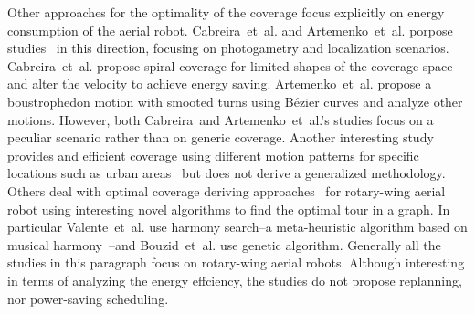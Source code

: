 Other approaches for the optimality of the coverage focus explicitly on energy consumption of the aerial robot. Cabreira~et~al. and Artemenko~et~al. porpose studies~\citep{cabreira2018energy,artemenko2016energy} in this direction, focusing on photogametry and localization scenarios. Cabreira~et~al. propose spiral coverage for limited shapes of the coverage space and alter the velocity to achieve energy saving. Artemenko~et~al. propose a boustrophedon motion with smooted turns using B\'{e}zier curves and analyze other motions. However, both Cabreira~and Artemenko~et~al.'s studies focus on a peculiar scenario rather than on generic coverage. Another interesting study provides and efficient coverage using different motion patterns for specific locations such as urban areas~\citep{dille2013efficient} but does not derive a generalized methodology. Others deal with optimal coverage deriving approaches~\citep{valente2013aerial,bouzid2017quadrotor} for rotary-wing aerial robot using interesting novel algorithms to find the optimal tour in a graph. In particular Valente~et~al. use harmony search--a meta-heuristic algorithm based on musical harmony~\citep{geem2009music}--and Bouzid~et~al. use genetic algorithm. Generally all the studies in this paragraph focus on rotary-wing aerial robots. Although interesting in terms of analyzing the energy effciency, the studies do not propose replanning, nor power-saving scheduling.









